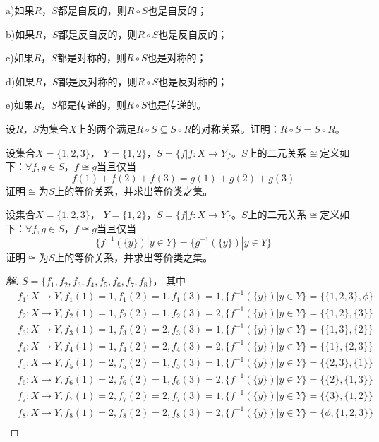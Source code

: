 \documentclass{article}
\begin{document}
\begin{CJK}{UTF8}{gbsn}
\begin{Exercise}
  a)如果$R$，$S$都是自反的，则$R\circ S$也是自反的；

  b)如果$R$，$S$都是反自反的，则$R\circ S$也是反自反的；

  c)如果$R$，$S$都是对称的，则$R\circ S$也是对称的；

  d)如果$R$，$S$都是反对称的，则$R\circ S$也是反对称的；


  e)如果$R$，$S$都是传递的，则$R\circ S$也是传递的。
\end{Exercise}
\vspace{2cm}
\begin{Exercise}
设$R$，$S$为集合$X$上的两个满足$R\circ S\subseteq S\circ R$的对称关系。证明：$R\circ S= S\circ R$。
\end{Exercise}
  \vspace{10cm}
  \begin{Exercise}
    设集合$X = \{1,2,3\}$， $Y = \{1,2\}$，$S = \{f|f:X \to Y\}$。$S$上的二元关系$\cong$定义如下：$\forall f,g\in S$，$f \cong g$当且仅当\[f(1) + f(2) + f(3) = g(1) + g(2) + g(3)\]证明$\cong$为$S$上的等价关系，并求出等价类之集。    
  \end{Exercise}
  \vspace{10cm}
 \begin{Exercise}
  设集合$X = \{1,2,3\}$， $Y = \{1,2\}$，$S = \{f|f:X \to Y\}$。$S$上的二元关系$\cong$定义如下：$\forall f,g\in S$，$f \cong g$当且仅当\[\{f^{-1}(\{y\}) | y \in Y\} = \{g^{-1}(\{y\})|y \in Y\}\]证明$\cong$为$S$上的等价关系，并求出等价类之集。  
\end{Exercise}
\begin{proof}[解]
    
    
  $S=\{f_1,f_2,f_3,f_4,f_5,f_6,f_7,f_8\}$，
  其中
  \begin{align*}
    &f_1:X\to Y, f_1(1)=1,f_1(2)=1,f_1(3) = 1, \{f^{-1}(\{y\}) | y \in Y\}=\{\{1,2,3\},\phi\}\\
    &f_2:X\to Y, f_2(1)=1,f_2(2)=1,f_2(3) = 2, \{f^{-1}(\{y\}) | y \in Y\}=\{\{1,2\},\{3\}\}\\
    &f_3:X\to Y, f_3(1)=1,f_3(2)=2,f_3(3) = 1, \{f^{-1}(\{y\}) | y \in Y\}=\{\{1,3\},\{2\}\}\\
    &f_4:X\to Y, f_4(1)=1,f_4(2)=2,f_4(3) = 2, \{f^{-1}(\{y\}) | y \in Y\}=\{\{1\},\{2,3\}\}\\
    &f_5:X\to Y, f_5(1)=2,f_5(2)=1,f_5(3) = 1, \{f^{-1}(\{y\}) | y \in Y\}=\{\{2,3\},\{1\}\}\\
    &f_6:X\to Y, f_6(1)=2,f_6(2)=1,f_6(3) = 2, \{f^{-1}(\{y\}) | y \in Y\}=\{\{2\},\{1,3\}\}\\
    &f_7:X\to Y, f_7(1)=2,f_7(2)=2,f_7(3) = 1, \{f^{-1}(\{y\}) | y \in Y\}=\{\{3\},\{1,2\}\}\\
    &f_8:X\to Y, f_8(1)=2,f_8(2)=2,f_8(3) = 2, \{f^{-1}(\{y\}) | y \in Y\}=\{\phi,\{1,2,3\}\}\\
  \end{align*}


\end{proof}
\end{CJK}
\end{document}
